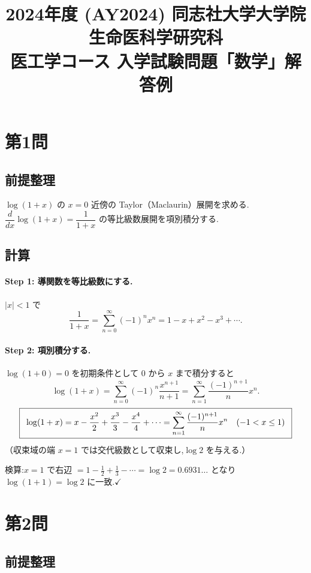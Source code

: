 \documentclass[11pt,a4paper]{article}
\title{2024年度 (AY2024) 同志社大学大学院 生命医科学研究科\\
医工学コース 入学試験問題「数学」解答例}
\author{}
\date{}
\begin{document}
\maketitle
\vspace{-3em}

\section*{第1問}

\subsection*{前提整理}

$\log(1+x)$ の $x=0$ 近傍の Taylor（Maclaurin）展開を求める.
$\dfrac{d}{dx}\log(1+x)=\dfrac{1}{1+x}$ の等比級数展開を項別積分する.

\subsection*{計算}

\paragraph{Step 1: 導関数を等比級数にする.}
$|x|<1$ で
\[
\frac{1}{1+x}=\sum_{n=0}^{\infty}(-1)^n x^n=1-x+x^2-x^3+\cdots.
\]

\paragraph{Step 2: 項別積分する.}
$\log(1+0)=0$ を初期条件として $0$ から $x$ まで積分すると
\[
\log(1+x)=\sum_{n=0}^{\infty}(-1)^n\frac{x^{n+1}}{n+1}
=\sum_{n=1}^{\infty}\frac{(-1)^{n+1}}{n}x^{n}.
\]
\[
\ans{\
\log(1+x)=x-\frac{x^2}{2}+\frac{x^3}{3}-\frac{x^4}{4}+\cdots
=\sum_{n=1}^{\infty}\frac{(-1)^{n+1}}{n}x^{n}\quad(-1<x\le1)\ }
\]
（収束域の端 $x=1$ では交代級数として収束し,$\log2$ を与える.）

検算:$x=1$ で右辺 $=1-\frac12+\frac13-\cdots=\log2=0.6931\ldots$ となり
$\log(1+1)=\log2$ に一致.$\checkmark$

\section*{第2問}

\subsection*{前提整理}
\end{document}
